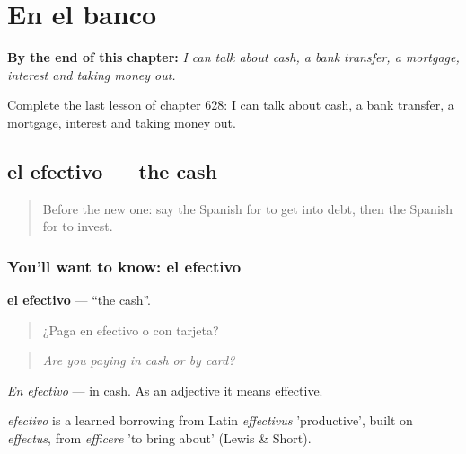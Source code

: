 
\chapter{En el banco}
\label{ch:es-en-el-banco}

\begin{chapteropening}
\textbf{By the end of this chapter:} \emph{I can talk about cash, a bank transfer, a mortgage, interest and taking money out.}

Complete the last lesson of chapter 628: I can talk about cash, a bank transfer, a mortgage, interest and taking money out.
\end{chapteropening}

\section[el efectivo]{el efectivo — the cash}

\label{lesson:ES-C628-efectivo}



\begin{quote}
Before the new one: say the Spanish for to get into debt, then the Spanish for to invest.
\end{quote}

\subsection*{You'll want to know: el efectivo}
\textbf{el efectivo} — \textquotedblleft{}the cash\textquotedblright{}.

\begin{quote}
¿Paga en efectivo o con tarjeta?
\end{quote}

\begin{quote}
\emph{Are you paying in cash or by card?}
\end{quote}

\emph{En efectivo} — in cash. As an adjective it means effective.

\begin{cousinweb}
\emph{efectivo} is a learned borrowing from Latin \emph{effectivus} 'productive', built on \emph{effectus}, from \emph{efficere} 'to bring about' (Lewis \& Short).
\end{cousinweb}

